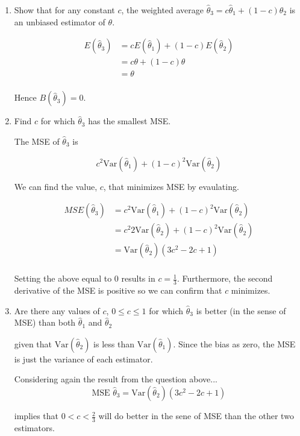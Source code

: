 \documentclass{tufte-book}
\newcommand{\Var}{\mathrm{Var}}
\theoremstyle{mytheoremstyle}
\theoremstyle{mylemstyle}
\theoremstyle{mydefstyle}
\begin{document}
\begin{enumerate}

\item Show that for any constant $c$, the weighted average $\hat{\theta}_3 = c\hat{\theta}_1 + (1-c)\hat{\theta}_2$ is an unbiased estimator of $\theta$.

\begin{align*}
E(\hat{\theta}_3) &= cE(\hat{\theta}_1) + (1-c)E(\hat{\theta}_2)\\
&= c\theta + (1-c)\theta\\
&= \theta\\
\end{align*}

Hence $B(\hat{\theta}_3) = 0$.

\item Find $c$ for which $\hat{\theta}_3$ has the smallest MSE.

The MSE of $\hat{\theta}_3$ is

\[ c^2\Var(\hat{\theta}_1) + (1-c)^2\Var(\hat{\theta}_2) \]

We can find the value, $c$, that minimizes MSE by evaulating.

\begin{align*}
MSE(\hat{\theta}_3) &= c^2\Var(\hat{\theta}_1) + (1-c)^2\Var(\hat{\theta}_2)\\
&=c^2 2\Var(\hat{\theta}_2) + (1-c)^2\Var(\hat{\theta}_2)\\
&=\Var(\hat{\theta}_2)(3c^2 - 2c + 1)\\
\end{align*}

Setting the above equal to $0$ results in $c=\frac{1}{3}$.  Furthermore, the second derivative of the MSE is positive so we can confirm that $c$ minimizes.

\item Are there any values of $c$, $0 \leq c \leq 1$ for which $\hat{\theta}_3$ is better (in the sense of MSE) than both $\hat{\theta}_1$ and $\hat{\theta}_2$

 given that $\Var(\hat{\theta}_2)$ is less than $\Var(\hat{\theta}_1)$.  Since the bias as zero, the MSE is just the variance of each estimator.

Considering again the result from the question above...
\[
\text{MSE }\hat{\theta}_3 = \Var(\hat{\theta}_2)(3c^2 - 2c +1)
\]

implies that $0< c < \frac{2}{3}$ will do better in the sene of MSE than the other two estimators.

\end{enumerate}
\end{document}
